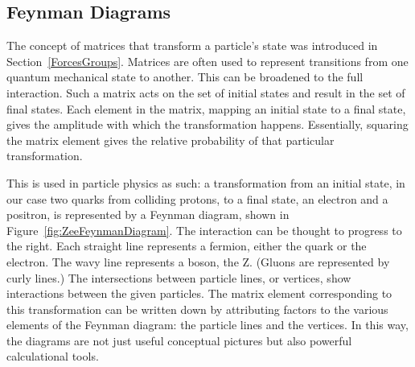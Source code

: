 \subsection{Feynman Diagrams}
\label{theory:feynman}

The concept of matrices that 
transform a particle's state 
was introduced in Section~\ref{ForcesGroups}. 
Matrices are often used to represent transitions 
from one quantum mechanical state to another.  
This can be broadened to the full interaction.  
Such a matrix acts on the set of initial states 
and result in the set of final states.  
Each element in the matrix, mapping an initial state 
to a final state, 
gives the amplitude with which the %
transformation happens.  
Essentially, squaring the matrix element gives the 
relative probability of that particular transformation.  

This is used in particle physics as such: 
a transformation from an initial state, 
in our case two quarks from colliding protons, 
to a final state, 
an electron and a positron, 
is represented by a Feynman diagram, 
shown in Figure~\ref{fig:ZeeFeynmanDiagram}.  
The interaction can be thought to progress to the right.  
Each straight line represents a fermion, 
either the quark or the electron.  
The wavy line represents a boson, the Z.  
(Gluons are represented by curly lines.)  
The intersections between particle lines, or vertices, 
show interactions between the given particles.  
The matrix element corresponding to this transformation 
can be written down 
by attributing factors to the various elements 
of the Feynman diagram: 
the particle lines and the vertices.  
In this way, the diagrams are not just useful 
conceptual pictures 
but also powerful calculational tools.  


